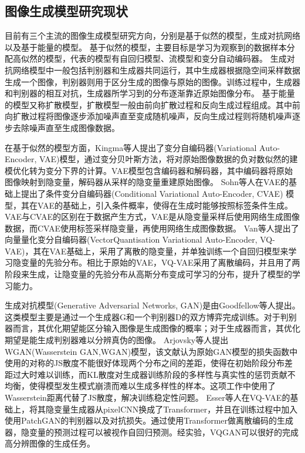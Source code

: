 \subsection{图像生成模型研究现状}
目前有三个主流的图像生成模型研究方向，分别是基于似然的模型，生成对抗网络以及基于能量的模型\cite{luoUnderstandingDiffusionModels2022}。
基于似然的模型，主要目标是学习为观察到的数据样本分配高似然的模型，代表的模型有自回归模型、流模型和变分自动编码器。
生成对抗网络模型中一般包括判别器和生成器共同运行，其中生成器根据隐空间采样数据生成一个图像，判别器则用于区分生成的图像与原始的图像。训练过程中，生成器和判别器的相互对抗，生成器所学习到的分布逐渐靠近原始图像分布。
基于能量的模型又称扩散模型，扩散模型一般由前向扩散过程和反向生成过程组成。其中前向扩散过程将图像逐步添加噪声直至变成随机噪声，反向生成过程则将随机噪声逐步去除噪声直至生成图像数据。
\par
在基于似然的模型方面，Kingma\cite{kingma2013auto}等人提出了变分自编码器(Variational Auto-Encoder, VAE)模型，通过变分贝叶斯方法，将对原始图像数据的负对数似然的建模优化转为变分下界的计算。VAE模型包含编码器和解码器，其中编码器将原始图像映射到隐变量，解码器从采样的隐变量重建原始图像。
Sohn\cite{sohnLearningStructuredOutput2015}等人在VAE的基础上提出了条件变分自编码器(Conditional Variational Auto-Encoder, CVAE) 模型，其在VAE的基础上，引入条件概率，使得在生成时能够按照标签条件生成。VAE与CVAE的区别在于数据产生方式，VAE是从隐变量采样后使用网络生成图像数据，而CVAE使用标签采样隐变量，再使用网络生成图像数据。
Van\cite{vandenoordNeuralDiscreteRepresentation2017}等人提出了向量量化变分自编码器(VectorQuantisation Variational Auto-Encoder, VQ-VAE)，其在VAE基础上，采用了离散的隐变量，并单独训练一个自回归模型来学习隐变量的先验分布。相比于原始的VAE，VQ-VAE采用了离散编码，并且用了两阶段来生成，让隐变量的先验分布从高斯分布变成可学习的分布，提升了模型的学习能力。
\par
生成对抗模型(Generative Adversarial Networks, GAN)是由Goodfellow\cite{goodfellow2020generative}等人提出。这类模型主要是通过一个生成器G和一个判别器D的双方博弈完成训练。对于判别器而言，其优化期望能区分输入图像是生成图像的概率；对于生成器而言，其优化期望是能生成判别器难以分辨真伪的图像。
Arjovsky\cite{arjovskyWassersteinGAN2017}等人提出WGAN(Wasserstein GAN,WGAN)模型，该文献认为原始GAN模型的损失函数中使用的对称的JS散度不能很好体现两个分布之间的差距，使得在初始阶段分布差距过大时难以训练，而KL散度对生成器训练阶段的多样性与真实性的惩罚贡献不均衡，使得模型发生模式崩溃而难以生成多样性的样本。这项工作中使用了Wasserstein距离代替了JS散度，解决训练稳定性问题。
Esser\cite{esserTamingTransformersHighResolution2021}等人在VQ-VAE的基础上，将其隐变量生成器从pixelCNN换成了Transformer，并且在训练过程中加入使用PatchGAN的判别器以及对抗损失。通过使用Transformer做离散编码的生成器，隐变量的预测过程可以被视作自回归预测。经实验，VQGAN可以很好的完成高分辨图像的生成任务。

